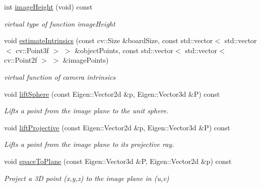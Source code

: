 \begin{DoxyCompactItemize}
\mbox{\label{classcamodocal_1_1OCAMCamera_a3e04e01571fa9f466cdfc0ebea3c5713}} 
int \hyperlink{classcamodocal_1_1OCAMCamera_a3e04e01571fa9f466cdfc0ebea3c5713}{image\+Height} (void) const
\begin{DoxyCompactList}\small\item\em virtual type of function image\+Height \end{DoxyCompactList}\item 
\mbox{\label{classcamodocal_1_1OCAMCamera_a4bfd88fd1871f77d56f5528455315b2d}} 
void \hyperlink{classcamodocal_1_1OCAMCamera_a4bfd88fd1871f77d56f5528455315b2d}{estimate\+Intrinsics} (const cv\+::\+Size \&board\+Size, const std\+::vector$<$ std\+::vector$<$ cv\+::\+Point3f $>$ $>$ \&object\+Points, const std\+::vector$<$ std\+::vector$<$ cv\+::\+Point2f $>$ $>$ \&image\+Points)
\begin{DoxyCompactList}\small\item\em virtual function of camera intrinsics \end{DoxyCompactList}\item 
void \hyperlink{classcamodocal_1_1OCAMCamera_a48112e1787548fc61c7545fc83ea2c81}{lift\+Sphere} (const Eigen\+::\+Vector2d \&p, Eigen\+::\+Vector3d \&P) const
\begin{DoxyCompactList}\small\item\em Lifts a point from the image plane to the unit sphere. \end{DoxyCompactList}\item 
void \hyperlink{classcamodocal_1_1OCAMCamera_afb73e19397c8be1fb498004d0e926a53}{lift\+Projective} (const Eigen\+::\+Vector2d \&p, Eigen\+::\+Vector3d \&P) const
\begin{DoxyCompactList}\small\item\em Lifts a point from the image plane to its projective ray. \end{DoxyCompactList}\item 
void \hyperlink{classcamodocal_1_1OCAMCamera_a06125c8a4cdf39e0a9353b291802b0ed}{space\+To\+Plane} (const Eigen\+::\+Vector3d \&P, Eigen\+::\+Vector2d \&p) const
\begin{DoxyCompactList}\small\item\em Project a 3D point ({\itshape x},{\itshape y},{\itshape z}) to the image plane in ({\itshape u},{\itshape v}) \end{DoxyCompactList}\item 

\end{DoxyCompactItemize}
